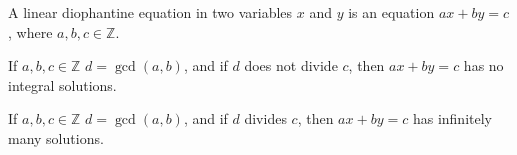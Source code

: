     \begin{definition}
       A linear diophantine equation in two variables
       $x$ and $y$ is an equation
       $ax+by=c$, where $a,b,c\in\mathbb{Z}$.
    \end{definition}
    \begin{theorem}
       If $a,b,c\in\mathbb{Z}$ $d=\gcd(a,b)$, and if $d$ does not
       divide $c$, then $ax+by=c$ has no integral solutions.
    \end{theorem}
    \begin{theorem}
       If $a,b,c\in\mathbb{Z}$ $d=\gcd(a,b)$, and if $d$ divides $c$,
       then $ax+by=c$ has infinitely many solutions.
    \end{theorem}
